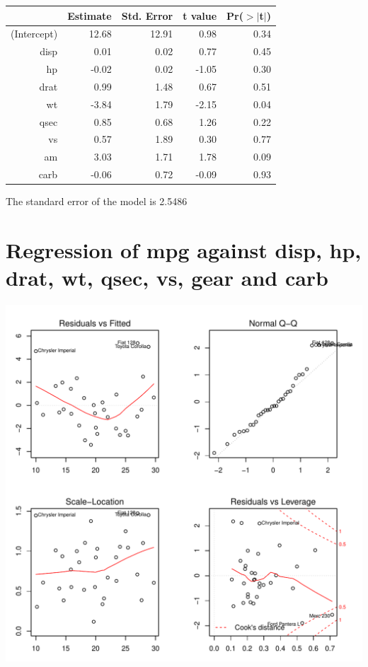 \documentclass{article}\usepackage[]{graphicx}\usepackage[]{color}
\makeatletter
\def\maxwidth{ %
  \ifdim\Gin@nat@width>\linewidth
    \linewidth
  \else
    \Gin@nat@width
  \fi
}
\newenvironment{knitrout}{}{} %
\makeatother
\begin{document}
\begin{table}[ht]
\centering
\begin{tabular}{rrrrr}
  \hline
 & Estimate & Std. Error & t value & Pr($>$$|$t$|$) \\ 
  \hline
(Intercept) & 12.68 & 12.91 & 0.98 & 0.34 \\ 
  disp & 0.01 & 0.02 & 0.77 & 0.45 \\ 
  hp & -0.02 & 0.02 & -1.05 & 0.30 \\ 
  drat & 0.99 & 1.48 & 0.67 & 0.51 \\ 
  wt & -3.84 & 1.79 & -2.15 & 0.04 \\ 
  qsec & 0.85 & 0.68 & 1.26 & 0.22 \\ 
  vs & 0.57 & 1.89 & 0.30 & 0.77 \\ 
  am & 3.03 & 1.71 & 1.78 & 0.09 \\ 
  carb & -0.06 & 0.72 & -0.09 & 0.93 \\ 
   \hline
\end{tabular}
\end{table}




The standard error of the model is 2.5486

\newpage

\section{Regression of mpg against disp, hp, drat, wt, qsec, vs, gear and carb }
\begin{knitrout}
\color{fgcolor}

{\centering \includegraphics[width=\maxwidth]{figure/lm-disp-hp-drat-wt-qsec-vs-gear-carb} 

}



\end{knitrout}
\end{document}
